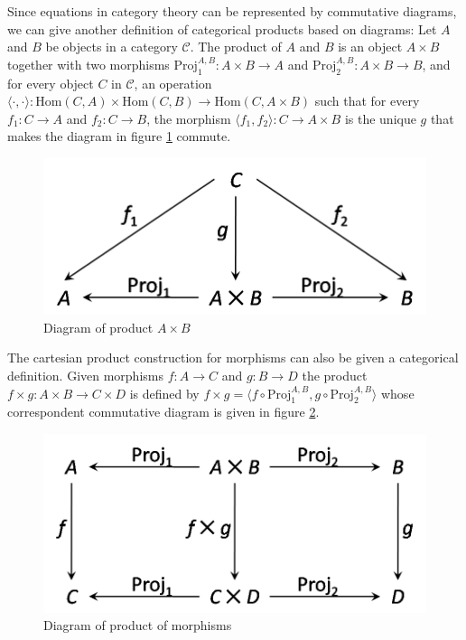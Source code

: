 Since equations in category theory can be represented by commutative diagrams, we can give another definition of categorical products based on diagrams: Let $ A $ and $ B $ be objects in a category $ \mathcal{C} $. The product of $ A $ and $ B $ is an object $ A \times B $ together with two morphisms $ \text{Proj}_1^{A,B}: A \times B \to A $ and $ \text{Proj}_2^{A,B}: A \times B \to B $, and for every object $ C $ in $ \mathcal{C} $, an operation $ \langle \cdot , \cdot \rangle : \text{Hom}(C,A) \times \text{Hom}(C,B) \to \text{Hom}(C, A \times B) $ such that for every $ f_1 : C \to A $ and $ f_2 : C \to B $, the morphism $ \langle f_1 , f_2 \rangle : C \to A \times B $ is the unique $ g $ that makes the diagram in figure \ref{figure:cat_prod} commute.
\begin{figure}[h!]
\centering
\includegraphics[scale=0.48]{./images/cat_prod}
\caption{Diagram of product $ A \times B $}
\label{figure:cat_prod}
\end{figure}

The cartesian product construction for morphisms can also be given a categorical definition. Given morphisms $ f : A \to C $ and $ g : B \to D $ the product $ f \times g : A \times B \to C \times D $ is defined by $ f \times g = \langle f \circ \text{Proj}_1^{A,B} , g \circ \text{Proj}_2^{A,B} \rangle $ whose correspondent commutative diagram is given in figure \ref{figure:cat_prod_mor}.
\begin{figure}[h!]
\centering
\includegraphics[scale=0.48]{./images/cat_prod_mor}
\caption{Diagram of product of morphisms}
\label{figure:cat_prod_mor}
\end{figure}

